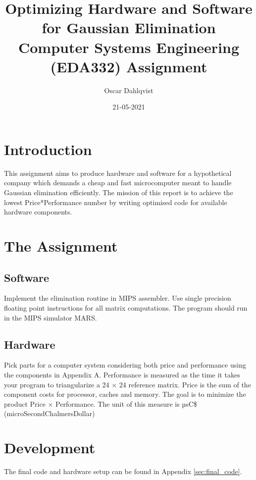 \documentclass{article}
\title{Optimizing Hardware and Software for Gaussian Elimination
\large \\ Computer Systems Engineering (EDA332) Assignment}
\author{Oscar Dahlqvist}
\date{21-05-2021}
\begin{document}
\maketitle

\newpage
\tableofcontents

\setcounter{subsection}{0}
\newpage
\section{Introduction}
This assignment aims to produce hardware and software for a hypothetical company which demands a
cheap and fast microcomputer meant to handle Gaussian elimination efficiently. 
The mission of this report is to achieve the lowest Price*Performance number by writing optimised code for  available hardware components.

\section{The Assignment}
\subsection{Software}
Implement the elimination routine in MIPS assembler. Use single precision floating 
point instructions for all matrix computations. The program should run in the MIPS 
simulator MARS.
\subsection{Hardware}
Pick parts for a computer system considering both price and performance using the components in Appendix A. Performance is measured as the time it takes your program to triangularize a 24 × 24 reference matrix. 
Price is the sum of the component costs for processor, caches and memory. The goal 
is to minimize the product Price × Performance. The unit of this measure is µsC\$
(microSecondChalmersDollar)

\section{Development}
The final code and hardware setup can be found in Appendix \ref{sec:final_code}.
\end{document}
